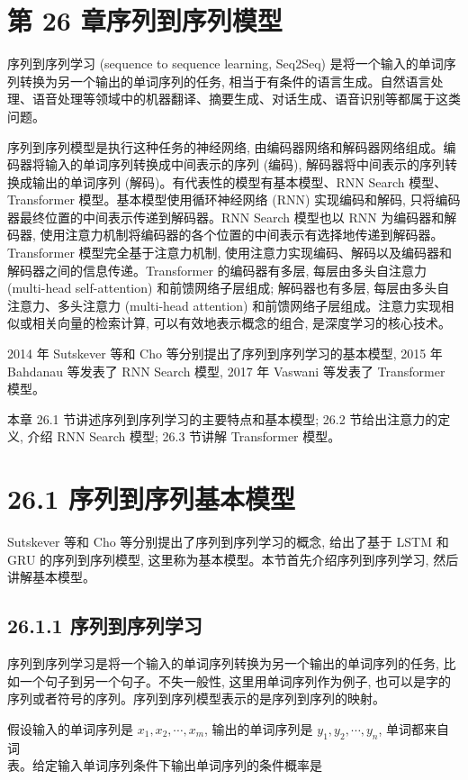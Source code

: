 \documentclass[10pt]{article}
\begin{document}
\section*{第 26 章序列到序列模型}
序列到序列学习 (sequence to sequence learning, Seq2Seq) 是将一个输入的单词序列转换为另一个输出的单词序列的任务, 相当于有条件的语言生成。自然语言处理、语音处理等领域中的机器翻译、摘要生成、对话生成、语音识别等都属于这类问题。

序列到序列模型是执行这种任务的神经网络, 由编码器网络和解码器网络组成。编码器将输入的单词序列转换成中间表示的序列 (编码), 解码器将中间表示的序列转换成输出的单词序列 (解码)。有代表性的模型有基本模型、RNN Search 模型、Transformer 模型。基本模型使用循环神经网络 (RNN) 实现编码和解码, 只将编码器最终位置的中间表示传递到解码器。RNN Search 模型也以 RNN 为编码器和解码器, 使用注意力机制将编码器的各个位置的中间表示有选择地传递到解码器。Transformer 模型完全基于注意力机制, 使用注意力实现编码、解码以及编码器和解码器之间的信息传递。Transformer 的编码器有多层, 每层由多头自注意力 (multi-head self-attention) 和前馈网络子层组成; 解码器也有多层, 每层由多头自注意力、多头注意力 (multi-head attention) 和前馈网络子层组成。注意力实现相似或相关向量的检索计算, 可以有效地表示概念的组合, 是深度学习的核心技术。

2014 年 Sutskever 等和 Cho 等分别提出了序列到序列学习的基本模型, 2015 年 Bahdanau 等发表了 RNN Search 模型, 2017 年 Vaswani 等发表了 Transformer 模型。

本章 26.1 节讲述序列到序列学习的主要特点和基本模型; 26.2 节给出注意力的定义, 介绍 RNN Search 模型; 26.3 节讲解 Transformer 模型。

\section*{26.1 序列到序列基本模型}
Sutskever 等和 Cho 等分别提出了序列到序列学习的概念, 给出了基于 LSTM 和 GRU 的序列到序列模型, 这里称为基本模型。本节首先介绍序列到序列学习, 然后讲解基本模型。

\subsection*{26.1.1 序列到序列学习}
序列到序列学习是将一个输入的单词序列转换为另一个输出的单词序列的任务, 比如一个句子到另一个句子。不失一般性, 这里用单词序列作为例子, 也可以是字的序列或者符号的序列。序列到序列模型表示的是序列到序列的映射。

假设输入的单词序列是 $x_{1}, x_{2}, \cdots, x_{m}$, 输出的单词序列是 $y_{1}, y_{2}, \cdots, y_{n}$, 单词都来自词\\
表。给定输入单词序列条件下输出单词序列的条件概率是
\end{document}
